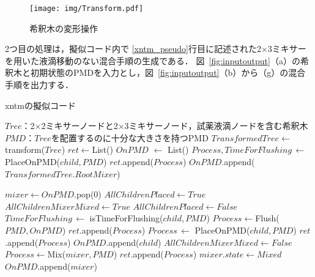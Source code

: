 \begin{figure}[tbp]
 \centering\texttt{[image: img/Transform.pdf]}
 \caption{希釈木の変形操作}\label{fig:Transform}
\end{figure}


2つ目の処理は，擬似コード内で
\ref{xntm_pseudo}行目に記述された2$\times$3ミキサーを用いた液滴移動のない混合手順の生成である．
図~\ref{fig:inputoutput}（a）の希釈木と初期状態のPMDを入力とし，図~\ref{fig:inputoutput}（b）から（g）の混合手順を出力する．



\begin{algorithm}[tbp]
 \caption{xntmの擬似コード}\label{alg:prop}
 \begin{algorithmic}[1]
     \Require $\mathit{Tree}$：2$\times$2ミキサーノードと2$\times$3ミキサーノード，試薬液滴ノードを含む希釈木 
     \Require $\mathit{PMD}$：$\mathit{Tree}$を配置するのに十分な大きさを持つPMD  
     \State $\mathit{TransformedTree} \gets$ transform($Tree$) \label{transform_pseudo}
     \State $\mathit{ret} \gets $List() \label{xntm_pseudo}
     \State $\mathit{OnPMD}$ $\gets$ List() \label{xntm}
     \State $\mathit{Process,TimeForFlushing}\,\gets $  PlaceOnPMD($\mathit{child,PMD}$)
     \State $\mathit{ret}$.append($\mathit{Process}$)
     \State $\mathit{OnPMD}$.append($TransformedTree.RootMixer$)
    
    \State {}
        \State$\mathit{mixer} \gets  \mathit{OnPMD}$.pop(0)
        \State $\mathit{AllChildrenPlaced}\gets\mathit{True}$
        \State $\mathit{AllChildrenMixerMixed}\gets\mathit{True}$
                \State$\mathit{AllChildrenPlaced \gets False}$
                \State $\mathit{TimeForFlushing}\, \gets$  isTimeForFlushing($\mathit{child,PMD}$) 
                    \State $\mathit{Process}\gets$Flush($\mathit{PMD,OnPMD}$)
                    \State $\mathit{ret}$.append($\mathit{Process}$)
                \EndIf
                \State $\mathit{Process}\, \gets$  PlaceOnPMD($\mathit{child,PMD}$)
                \State $\mathit{ret}$.append($\mathit{Process}$)
                \State $\mathit{OnPMD}$.append($\mathit{child}$) 
            \EndIf 
                \State $\mathit{AllChildrenMixerMixed}\gets\mathit{False}$
            \EndIf 
        \EndFor 
            \State$\mathit{Process}\gets$Mix($\mathit{mixer,PMD}$)
            \State $\mathit{ret}$.append($\mathit{Process}$)
            \State$\mathit{mixer.state} \gets \mathit{Mixed}$ 
        \EndIf
        \State$\mathit{OnPMD}$.append($\mathit{mixer}$)
    \EndWhile 


\end{algorithmic}
\end{algorithm}

